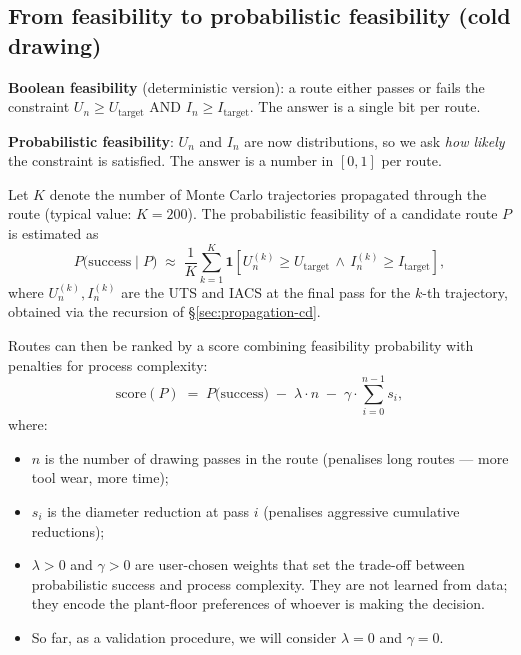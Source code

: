 \documentclass[11pt,a4paper]{article}
\begin{document}
\subsection{From feasibility to probabilistic feasibility (cold drawing)}

\begin{recapbox}
\textbf{Boolean feasibility} (deterministic version): a route either passes or fails the constraint $U_n \geq U_{\text{target}}$ AND $I_n \geq I_{\text{target}}$. The answer is a single bit per route.

\textbf{Probabilistic feasibility}: $U_n$ and $I_n$ are now distributions, so we ask \emph{how likely} the constraint is satisfied. The answer is a number in $[0, 1]$ per route.
\end{recapbox}

Let $K$ denote the number of Monte Carlo trajectories propagated through the route (typical value: $K = 200$). The probabilistic feasibility of a candidate route $P$ is estimated as
\begin{equation}
P\!\big(\text{success} \mid P\big)
\;\approx\;
\frac{1}{K}\sum_{k=1}^K \mathbf{1}\!\left[U_n^{(k)} \geq U_{\text{target}} \,\wedge\, I_n^{(k)} \geq I_{\text{target}}\right],
\label{eq:prob-feasibility}
\end{equation}
where $U_n^{(k)}, I_n^{(k)}$ are the UTS and IACS at the final pass for the $k$-th trajectory, obtained via the recursion of §\ref{sec:propagation-cd}.

Routes can then be ranked by a score combining feasibility probability with penalties for process complexity:
\begin{equation}
\mathrm{score}(P) \;=\; P\big(\text{success}\big) \;-\; \lambda \cdot n \;-\; \gamma \cdot \!\!\sum_{i=0}^{n-1} s_i,
\label{eq:risk-score}
\end{equation}
where:
\begin{itemize}
    \item $n$ is the number of drawing passes in the route (penalises long routes — more tool wear, more time);
    \item $s_i$ is the diameter reduction at pass $i$ (penalises aggressive cumulative reductions);
    \item $\lambda > 0$ and $\gamma > 0$ are user-chosen weights that set the trade-off between probabilistic success and process complexity. They are not learned from data; they encode the plant-floor preferences of whoever is making the decision.
    \item So far, as a validation procedure, we will consider  $\lambda = 0$ and $\gamma = 0$.
\end{itemize}
\end{document}
